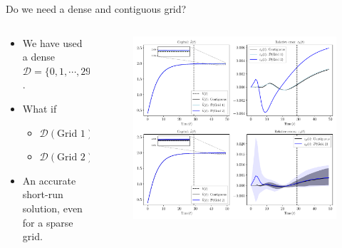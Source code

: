 \documentclass[aspectratio=169,10pt]{beamer}
\begin{document}
\begin{frame}{Do we need a dense and contiguous grid?}

\begin{columns}
	\begin{column}{0.5\textwidth}
		\begin{itemize}
			\item We have used a dense $\mathcal{D} = \{0,1,\cdots,29\}$.
			\vspace{0.05in}
			\item What if 
			\begin{itemize}
				\item $\mathcal{D}(\text{Grid 1}) = \{0, 1, 2, 4, 6, 8, 12, 16, 20, 24, 29\}$
				\item $\mathcal{D}(\text{Grid 2}) = \{0, 1, 4, 8, 12, 18, 24, 29\}$
			\end{itemize}
			\vspace{0.05in}
			\item An accurate short-run solution, even for a sparse grid.
		\end{itemize}
	\end{column}
	\begin{column}{0.5\textwidth}
		\begin{figure}[t!]
			\centering
			\includegraphics[width=\textwidth]{figs/growth_sequential_g0_grids.pdf}
			\vspace{-7mm}
		\end{figure}
	\end{column}
\end{columns}

\end{frame}
\end{document}

